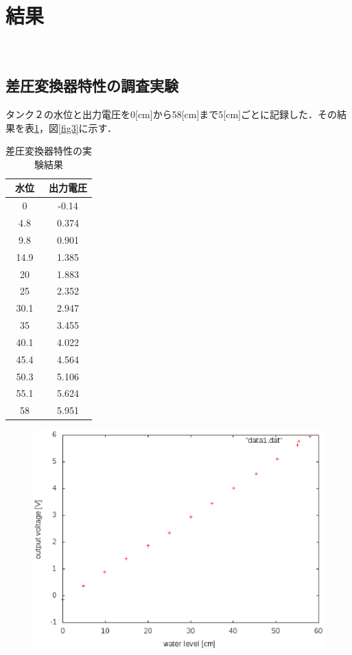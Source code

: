 \documentclass[11pt,a4paper]{jsarticle}
\begin{document}
 \section{結果}
　\subsection{差圧変換器特性の調査実験}
タンク２の水位と出力電圧を0[cm]から58[cm]まで5[cm]ごとに記録した．その結果を表\ref{tab1}，図\ref{fig3}に示す．
\begin{table}[hb]
\centering
\caption{差圧変換器特性の実験結果}
\label{tab1}
 \begin{tabular}{|c|c|} \hline
  水位　& 出力電圧 \\ \hline \hline
  0	& -0.14 \\ \hline
  4.8	& 0.374 \\ \hline
  9.8	& 0.901 \\ \hline
  14.9	& 1.385 \\ \hline
  20	& 1.883 \\ \hline
  25	& 2.352 \\ \hline
  30.1	& 2.947 \\ \hline
  35	& 3.455 \\ \hline
  40.1	& 4.022 \\ \hline 
  45.4  & 4.564 \\ \hline 
  50.3	& 5.106 \\ \hline
  55.1	& 5.624 \\ \hline
  58	& 5.951 \\ \hline
 \end{tabular}
\end{table}
\newpage
\begin{figure}[hb]
 \begin{center}
  \includegraphics[scale = .7]{./picture/data1.eps}
 \end{center}
\end{figure}
\end{document}
